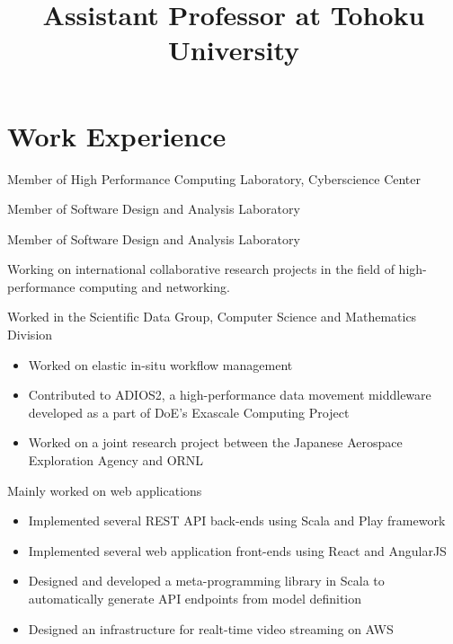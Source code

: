 \documentclass[10pt,a4paper,sans]{moderncv}
\title{Assistant Professor at Tohoku University}
\begin{document}
\makecvtitle

\section{Work Experience}

%
{%
Member of High Performance Computing Laboratory, Cyberscience Center
}

%
{%
Member of Software Design and Analysis Laboratory
}

%
{%
Member of Software Design and Analysis Laboratory
}

%
{%
Working on international collaborative research projects in the field of
high-performance computing and networking.
}

%
{%
Worked in the Scientific Data Group, Computer Science and Mathematics Division
\begin{itemize}%
\item Worked on elastic in-situ workflow management
\item Contributed to ADIOS2, a high-performance data movement middleware
    developed as a part of DoE's Exascale Computing Project
\item Worked on a joint research project between the Japanese Aerospace
    Exploration Agency and ORNL
\end{itemize}
}

%
{Mainly worked on web applications%
\begin{itemize}%
\item Implemented several REST API back-ends using Scala and Play framework
\item Implemented several web application front-ends using React and AngularJS
\item Designed and developed a meta-programming library in Scala to
    automatically generate API endpoints from model definition
\item Designed an infrastructure for realt-time video streaming on AWS
\end{itemize}}
\end{document}

